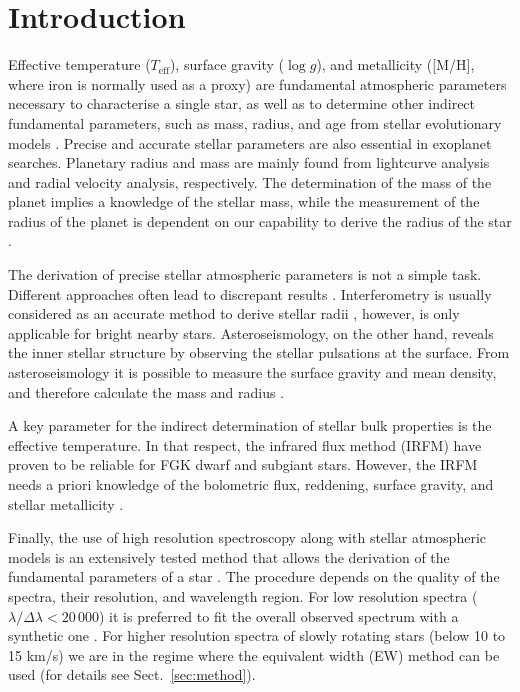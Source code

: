 \documentclass{aa}
\begin{document}
\maketitle



\section{Introduction}
\label{sec:introduction}

Effective temperature ($T_\mathrm{eff}$), surface gravity ($\log g$),
and metallicity ([M/H], where iron is normally used as a proxy)
are fundamental atmospheric parameters necessary to characterise a single
star, as well as to determine other indirect fundamental parameters,
such as mass, radius, and age from stellar evolutionary models
\citep[see e.g.][]{Girardi2000,Dotter2008,Baraffe2015}.
Precise and accurate stellar parameters are also essential in
exoplanet searches. Planetary radius and mass are mainly found from
lightcurve analysis and radial velocity analysis, respectively. The
determination of the mass of the planet implies a knowledge of the
stellar mass, while the measurement of the radius of the planet
is dependent on our capability to derive the radius of the star
\citep[see e.g.][]{Torres2008,Ammler2009,Torres2012}.

The derivation of precise stellar atmospheric parameters is not a simple
task. Different approaches often lead to discrepant results \citep[see
e.g.][]{Santos13}. Interferometry is usually considered as an accurate
method to derive stellar radii \citep[e.g.][]{Boyajian2012}, however,
is only applicable for bright nearby stars. Asteroseismology, on the
other hand, reveals the inner stellar structure by observing the stellar
pulsations at the surface. From asteroseismology it is possible to
measure the surface gravity and mean density, and therefore calculate
the mass and radius \citep[e.g.][]{Kjeldsen1995}.

A key parameter for the indirect determination of stellar bulk properties
is the effective temperature. In that respect, the infrared flux method (IRFM) have
proven to be reliable for FGK dwarf and subgiant stars. However,
the IRFM needs a priori knowledge of the bolometric flux, reddening,
surface gravity, and stellar metallicity \citep{Blackwell1977,Ramirez2005b,Casagrande2010}.

Finally, the use of high resolution spectroscopy along with stellar
atmospheric models is an extensively tested method that allows
the derivation of the fundamental parameters of a star \citep[see
e.g.][]{Santos13,Valenti2005}. The procedure depends on the quality of the spectra,
their resolution, and wavelength region. For low resolution spectra
($\lambda/\Delta\lambda < 20\,000$) it is preferred to fit the overall
observed spectrum with a synthetic one \citep[see e.g.][]{Recio2006}.
For higher resolution spectra of slowly rotating stars (below 10 to 15
\si{km/s}) we are in the regime where the equivalent width (EW) method
can be used (for details see Sect.~\ref{sec:method}).
\end{document}
